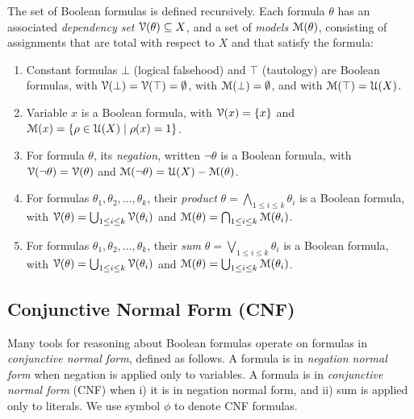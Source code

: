 \documentclass[letterpaper,USenglish,cleveref, autoref, thm-restate]{lipics-v2021}
\newcommand{\boolnot}{\neg}
\newcommand{\tautology}{\top}
\newcommand{\nil}{\bot}
\newcommand{\varset}{X}
\newcommand{\dependencyset}{{\cal V}}
\newcommand{\assign}{\rho}
\newcommand{\uassign}{{\cal U}}
\newcommand{\modelset}{{\cal M}}
\begin{document}
\begin{definition}
  The set of Boolean formulas is defined recursively.  Each
  formula $\theta$ has an associated \emph{dependency set}
  $\dependencyset(\theta)  \subseteq \varset$, and a set of \emph{models} $\modelset(\theta)$,
  consisting of assignments that are total with respect to $\varset$ and that satisfy the formula:
  \begin{enumerate}
  \item Constant formulas $\nil$ (logical falsehood) and $\tautology$ (tautology) are Boolean formulas,
    with $\dependencyset(\nil) = \dependencyset(\tautology) = \emptyset$, with $\modelset(\nil) = \emptyset$, and with $\modelset(\tautology) = \uassign(\varset)$.
  \item Variable $x$ is a Boolean formula, with $\dependencyset(x) = \{x\}$
    and $\modelset(x) = \{\assign \in \uassign(\varset) \mid  \assign(x)=1\}$.
  \item For formula $\theta$, its \emph{negation}, written $\boolnot \theta$ is a Boolean formula,
    with $\dependencyset(\boolnot \theta) = \dependencyset(\theta)$ and $\modelset(\boolnot \theta) = \uassign(\varset) - \modelset(\theta)$.
  \item For formulas $\theta_1, \theta_2, \ldots, \theta_k$, their \emph{product} $\theta = \bigwedge_{1 \leq i \leq k} \theta_i$ is a Boolean formula, with
      $\dependencyset(\theta) = \bigcup_{1 \leq i \leq k} \dependencyset(\theta_i)$ and
      $\modelset(\theta) = \bigcap_{1 \leq i \leq k} \modelset(\theta_i)$.
  \item For formulas $\theta_1, \theta_2, \ldots, \theta_k$, their \emph{sum} $\theta = \bigvee_{1 \leq i \leq k} \theta_i$ is a Boolean formula, with
      $\dependencyset(\theta) = \bigcup_{1 \leq i \leq k} \dependencyset(\theta_i)$ and
      $\modelset(\theta) = \bigcup_{1 \leq i \leq k} \modelset(\theta_i)$.
  \end{enumerate}
\label{def:boolean}
\end{definition}

\subsection{Conjunctive Normal Form (CNF)}

  Many tools for reasoning about Boolean formulas operate on formulas in \emph{conjunctive normal form}, defined as follows.
  A formula is in  \emph{negation normal form} when negation is applied only to variables.  A
  formula is in \emph{conjunctive normal form} (CNF) when i) it is in
  negation normal form, and ii) sum is applied only to literals.  We use symbol $\phi$ to denote CNF formulas.
\end{document}
